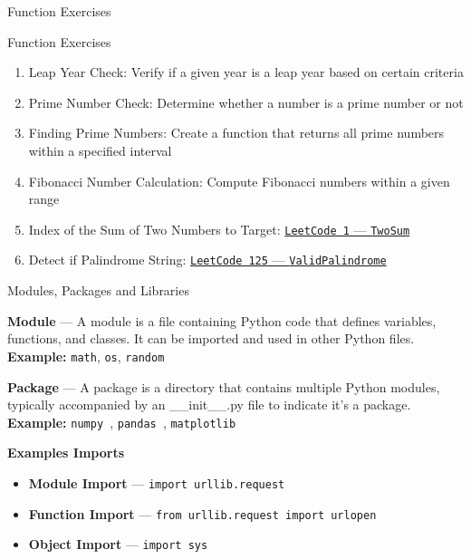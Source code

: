 \documentclass[
	11pt, 
]{beamer}
\begin{document}


\begin{frame}[fragile]{Function Exercises}

\begin{alertblock}{Function Exercises}
    \begin{enumerate}
        \item Leap Year Check: Verify if a given year is a leap year based on certain criteria
        \item Prime Number Check: Determine whether a number is a prime number or not
        \item Finding Prime Numbers: Create a function that returns all prime numbers within a specified interval
        \item Fibonacci Number Calculation: Compute Fibonacci numbers within a given range
        \item Index of the Sum of Two Numbers to Target: \href{https://leetcode.com/problems/two-sum/}{\texttt{LeetCode 1} --- \texttt{TwoSum}}
        \item Detect if Palindrome String: \href{https://leetcode.com/problems/valid-palindrome/description/}{\texttt{LeetCode 125} --- \texttt{ValidPalindrome}}
    \end{enumerate}
\end{alertblock}

\end{frame}



\begin{frame}[fragile]{Modules, Packages and Libraries}

\textbf{Module} --- A module is a file containing Python code that defines variables, functions, and classes. It can be imported and used in other Python files. \textbf{Example:} \texttt{math}, \texttt{os}, \texttt{random}

\vspace{.5cm}

\textbf{Package} --- A package is a directory that contains multiple Python modules, typically accompanied by an \_\_init\_\_.py file to indicate it's a package. \textbf{Example:} \texttt{numpy }, \texttt{pandas }, \texttt{matplotlib}

\vspace{.5cm}


\begin{block}{\textbf{Examples Imports}}
    \begin{itemize}
        \item \textbf{Module Import} --- \texttt{import urllib.request}
        \item \textbf{Function Import} --- \texttt{from urllib.request import urlopen}
        \item \textbf{Object Import} --- \texttt{import sys}
    \end{itemize}
\end{block}


\end{frame}
\end{document}
